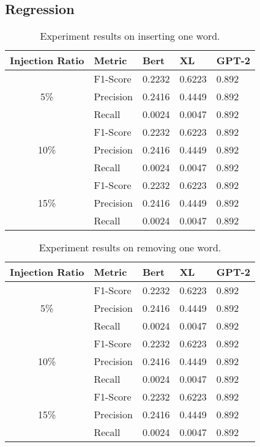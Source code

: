 
\begin{appendix}


\section{Regression}
\begin{table}
\centering
\begin{tabular}{ c l l l l }
\toprule
Injection Ratio & Metric & Bert & XL & GPT-2\\
\midrule
     & F1-Score & 0.2232 & 0.6223 & 0.892\\
5\%  & Precision & 0.2416 & 0.4449 & 0.892\\
     & Recall & 0.0024 & 0.0047 & 0.892\\ 
\midrule
     & F1-Score & 0.2232 & 0.6223 & 0.892\\
10\% & Precision & 0.2416 & 0.4449 & 0.892\\
     & Recall & 0.0024 & 0.0047 & 0.892\\ 
\midrule
     & F1-Score & 0.2232 & 0.6223 & 0.892\\
15\% & Precision & 0.2416 & 0.4449 & 0.892\\
     & Recall & 0.0024 & 0.0047 & 0.892\\ 
\bottomrule
\end{tabular}
\caption{Experiment results on inserting one word.}
\end{table}



\begin{table}
\centering
\begin{tabular}{ c l l l l }
\toprule
Injection Ratio & Metric & Bert & XL & GPT-2\\
\midrule
     & F1-Score & 0.2232 & 0.6223 & 0.892\\
5\%  & Precision & 0.2416 & 0.4449 & 0.892\\
     & Recall & 0.0024 & 0.0047 & 0.892\\ 
\midrule
     & F1-Score & 0.2232 & 0.6223 & 0.892\\
10\% & Precision & 0.2416 & 0.4449 & 0.892\\
     & Recall & 0.0024 & 0.0047 & 0.892\\ 
\midrule
     & F1-Score & 0.2232 & 0.6223 & 0.892\\
15\% & Precision & 0.2416 & 0.4449 & 0.892\\
     & Recall & 0.0024 & 0.0047 & 0.892\\ 
\bottomrule
\end{tabular}
\caption{Experiment results on removing one word.}
\end{table}



\end{appendix}
